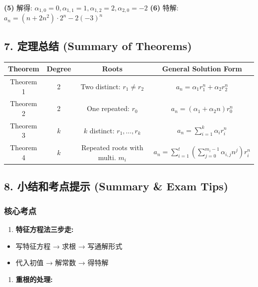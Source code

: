 \documentclass[10pt,a4paper,openany]{ctexbook}
\theoremstyle{definition}
\theoremstyle{remark}
\begin{document}
\textbf{(5)} 解得: $\alpha_{1,0} = 0, \alpha_{1,1} = 1, \alpha_{1,2} = 2, \alpha_{2,0} = -2$
\textbf{(6)} 特解: $a_n = (n + 2n^2) \cdot 2^n - 2(-3)^n$
\vspace{-2pt}

\subsection{7. 定理总结 (Summary of Theorems)}

\begin{center}
\begin{tabular}{cccc}
\hline
Theorem & Degree & Roots & General Solution Form \\ \hline
Theorem 1 & 2 & Two distinct: $r_1 \neq r_2$ & $a_n = \alpha_1 r_1^n + \alpha_2 r_2^n$ \\
Theorem 2 & 2 & One repeated: $r_0$ & $a_n = (\alpha_1 + \alpha_2 n) r_0^n$ \\
Theorem 3 & $k$ & $k$ distinct: $r_1,\dots,r_k$ & $a_n = \sum_{i=1}^k \alpha_i r_i^n$ \\
Theorem 4 & $k$ & Repeated roots with multi. $m_i$ & $a_n = \sum_{i=1}^t (\sum_{j=0}^{m_i-1} \alpha_{i,j} n^j) r_i^n$ \\
\hline
\end{tabular}

\end{center}

\vspace{-2pt}

\subsection{8. 小结和考点提示 (Summary \& Exam Tips)}

\subsubsection{核心考点}

\begin{enumerate}
\item \textbf{特征方程法三步走:}
\end{enumerate}

\begin{itemize}
\item 写特征方程 → 求根 → 写通解形式
\item 代入初值 → 解常数 → 得特解

\end{itemize}

\begin{enumerate}
\item \textbf{重根的处理:}
\end{enumerate}
\end{document}
